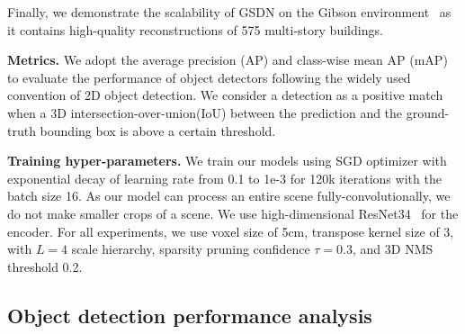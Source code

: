 \documentclass[runningheads]{llncs}
\newcommand{\methodname}{GSDN\xspace}
\begin{document}
Finally, we demonstrate the scalability of \methodname on the Gibson environment~\cite{xiazamirhe2018gibsonenv} as it contains high-quality reconstructions of 575 multi-story buildings. 

\noindent\textbf{Metrics.} We adopt the average precision (AP) and class-wise mean AP (mAP) to evaluate the performance of object detectors following the widely used convention of 2D object detection. We consider a detection as a positive match when a 3D intersection-over-union(IoU) between the prediction and the ground-truth bounding box is above a certain threshold.




\noindent\textbf{Training hyper-parameters.} We train our models using SGD optimizer with exponential decay of learning rate from 0.1 to 1e-3 for 120k iterations with the batch size 16. As our model can process an entire scene fully-convolutionally, we do not make smaller crops of a scene. We use high-dimensional ResNet34~\cite{minkowskinet,he2016deep} for the encoder. For all experiments, we use voxel size of 5cm, transpose kernel size of 3, with $L=4$ scale hierarchy, sparsity pruning confidence $\tau=0.3$, and 3D NMS threshold 0.2.

\subsection{Object detection performance analysis}
\label{sec:comparison}
\end{document}
